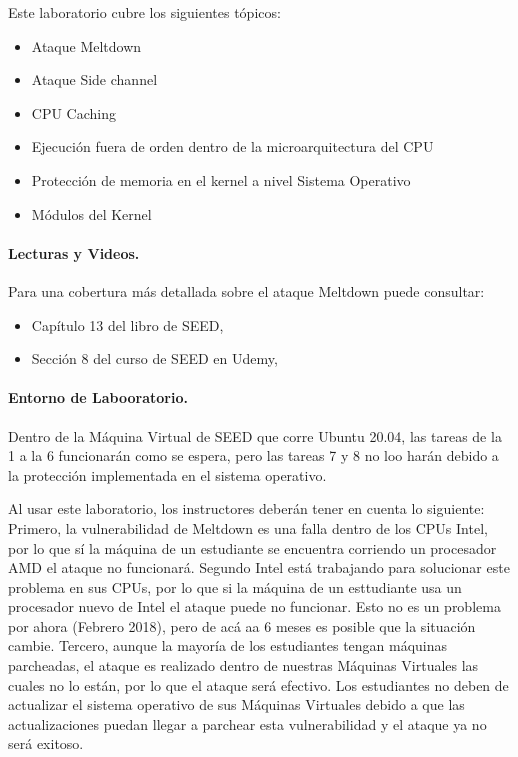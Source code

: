 Este laboratorio cubre los siguientes tópicos:

\begin{itemize}[noitemsep]
\item Ataque Meltdown 
\item Ataque Side channel 
\item CPU Caching
\item Ejecución fuera de orden dentro de la microarquitectura del CPU
\item Protección de memoria en el kernel a nivel Sistema Operativo
\item Módulos del Kernel
\end{itemize} 


\paragraph{Lecturas y Videos.}
Para una cobertura más detallada sobre el ataque Meltdown puede consultar:

\begin{itemize}
\item Capítulo 13 del libro de SEED, \seedbook
\item Sección 8 del curso de SEED en Udemy, \seedcsvideo
\end{itemize}



\paragraph{Entorno de Labooratorio.} \seedenvironment Dentro de la Máquina Virtual de SEED que corre Ubuntu 20.04, las tareas de la 1 a la 6 funcionarán como se espera, pero las tareas 7 y 8 no loo harán debido a la protección implementada en el sistema operativo.

Al usar este laboratorio, los instructores deberán tener en cuenta lo siguiente:
Primero, la vulnerabilidad de Meltdown es una falla dentro de los CPUs Intel, por lo que sí la máquina de un estudiante se encuentra corriendo un procesador AMD el ataque no funcionará. 
Segundo Intel está trabajando para solucionar este problema en sus CPUs, por lo que si la máquina de un esttudiante usa un procesador nuevo de Intel el ataque puede no funcionar. Esto no es un problema por ahora (Febrero 2018), pero de acá aa 6 meses es posible que la situación cambie.
Tercero, aunque la mayoría de los estudiantes tengan máquinas parcheadas, el ataque es realizado dentro de nuestras Máquinas Virtuales las cuales no lo están, por lo que el ataque será efectivo.
Los estudiantes no deben de actualizar el sistema operativo de sus Máquinas Virtuales debido a que las actualizaciones puedan llegar a parchear esta vulnerabilidad y el ataque ya no será exitoso.


